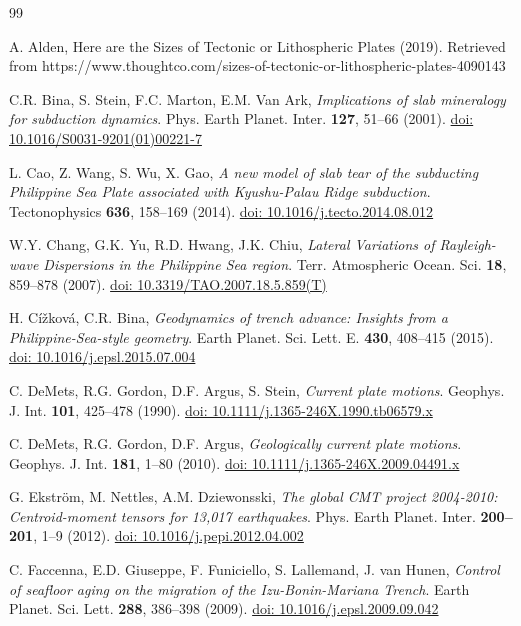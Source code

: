 \documentclass{rrparticle}
\begin{document}
\begin{thebibliography}{99}

A. Alden, Here are the Sizes of Tectonic or Lithospheric Plates (2019). Retrieved from https://www.thoughtco.com/sizes-of-tectonic-or-lithospheric-plates-4090143 

C.R. Bina, S. Stein, F.C. Marton, E.M. Van Ark, \emph{Implications of slab mineralogy for subduction dynamics}. Phys. Earth Planet. Inter. \textbf{127}, 51--66 (2001). \href{https://doi.org/10.1016/S0031-9201(01)00221-7}{doi: 10.1016/S0031-9201(01)00221-7}

 L. Cao, Z. Wang, S. Wu, X. Gao, \emph{A new model of slab tear of the subducting Philippine Sea Plate associated with Kyushu-Palau Ridge subduction}. Tectonophysics \textbf{636}, 158--169 (2014). \href{https://doi.org/10.1016/j.tecto.2014.08.012}{doi: 10.1016/j.tecto.2014.08.012}

 W.Y. Chang, G.K. Yu, R.D. Hwang, J.K. Chiu, \emph{Lateral Variations of Rayleigh-wave Dispersions in the Philippine Sea region}. Terr. Atmospheric Ocean. Sci. \textbf{18}, 859--878 (2007). \href{https://doi.org/10.3319/TAO.2007.18.5.859(T)}{doi: 10.3319/TAO.2007.18.5.859(T)}

 H. Cížková, C.R. Bina, \emph{Geodynamics of trench advance: Insights from a Philippine-Sea-style geometry}. Earth Planet. Sci. Lett. E. \textbf{430}, 408--415 (2015). \href{https://doi.org/10.1016/j.epsl.2015.07.004}{doi: 10.1016/j.epsl.2015.07.004}

 C. DeMets, R.G. Gordon, D.F. Argus, S. Stein, \emph{Current plate motions}. Geophys. J. Int. \textbf{101}, 425--478 (1990). \href{https://doi.org/10.1111/j.1365-246X.1990.tb06579.x}{doi: 10.1111/j.1365-246X.1990.tb06579.x}

 C. DeMets, R.G. Gordon, D.F. Argus, \emph{Geologically current plate motions}. Geophys. J. Int. \textbf{181}, 1--80 (2010). \href{https://doi.org/10.1111/j.1365-246X.2009.04491.x}{doi: 10.1111/j.1365-246X.2009.04491.x}

 G. Ekstr\"om, M. Nettles, A.M. Dziewonsski, \emph{The global CMT project 2004-2010: Centroid-moment tensors for 13,017 earthquakes}. Phys. Earth Planet. Inter. \textbf{200--201}, 1--9 (2012). \href{https://doi.org/10.1016/j.pepi.2012.04.002}{doi: 10.1016/j.pepi.2012.04.002}

 C. Faccenna, E.D. Giuseppe, F. Funiciello, S. Lallemand, J. van Hunen, \emph{Control of seafloor aging on the migration of the Izu-Bonin-Mariana Trench}. Earth Planet. Sci. Lett. \textbf{288}, 386--398 (2009). \href{https://doi.org/10.1016/j.epsl.2009.09.042}{doi: 10.1016/j.epsl.2009.09.042}


\end{thebibliography}
\end{document}
